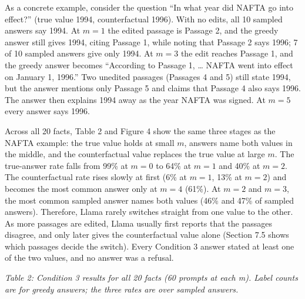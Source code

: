 \documentclass[
  12pt,
  letterpaper,
]{article}
\begin{document}
As a concrete example, consider the question ``In
what year did NAFTA go into effect?'' (true value
1994, counterfactual 1996). With no edits, all 10
sampled answers say 1994. At \(m = 1\) the edited
passage is Passage 2, and the greedy answer still
gives 1994, citing Passage 1, while noting that
Passage 2 says 1996; 7 of 10 sampled answers give
only 1994. At \(m = 3\) the edit reaches Passage
1, and the greedy answer becomes ``According to
Passage 1, \ldots{} NAFTA went into effect on
January 1, 1996.'' Two unedited passages (Passages
4 and 5) still state 1994, but the answer mentions
only Passage 5 and claims that Passage 4 also says
1996. The answer then explains 1994 away as the
year NAFTA was signed. At \(m = 5\) every answer
says 1996.

Across all 20 facts, Table 2 and Figure 4 show the
same three stages as the NAFTA example: the true
value holds at small \(m\), answers name both
values in the middle, and the counterfactual value
replaces the true value at large \(m\). The
true-answer rate falls from 99\% at \(m = 0\) to
64\% at \(m = 1\) and 40\% at \(m = 2\). The
counterfactual rate rises slowly at first (6\% at
\(m = 1\), 13\% at \(m = 2\)) and becomes the most
common answer only at \(m = 4\) (61\%). At
\(m = 2\) and \(m = 3\), the most common sampled
answer names both values (46\% and 47\% of sampled
answers). Therefore, Llama rarely switches
straight from one value to the other. As more
passages are edited, Llama usually first reports
that the passages disagree, and only later gives
the counterfactual value alone (Section 7.5 shows
which passages decide the switch). Every Condition
3 answer stated at least one of the two values,
and no answer was a refusal.

\emph{Table 2: Condition 3 results for all 20
facts (60 prompts at each m). Label counts are for
greedy answers; the three rates are over sampled
answers.}
\end{document}
